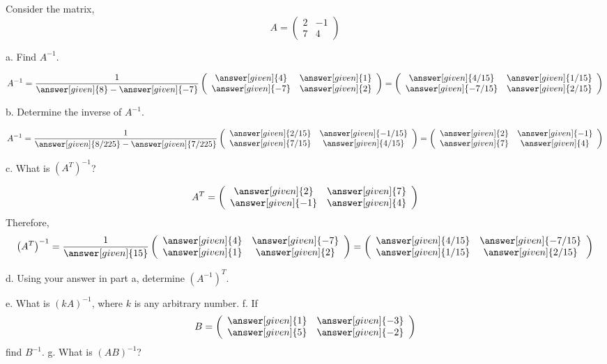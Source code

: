 \documentclass{ximera}
\begin{document}
\begin{example}\label{example1}
Consider the matrix,
\[A= \left(\begin{array}{cc}
  2 &  -1  \\
   7&  4
\end{array}\right)\]

a. Find $A^{-1}$.
\begin{prompt}
\[A^{-1}= \frac{1}{\answer[given]{8}- \answer[given]{-7}}\left(\begin{array}{cc}
  \answer[given]{4} &  \answer[given]{1}  \\
   \answer[given]{-7}&  \answer[given]{2}
\end{array}\right)= \left(\begin{array}{cc}
  \answer[given]{4/15} &  \answer[given]{1/15}  \\
   \answer[given]{-7/15}&  \answer[given]{2/15}
\end{array}\right)
\]
\end{prompt}
b. Determine the inverse of $A^{-1}$.
\begin{prompt}
\[A^{-1}= \frac{1}{\answer[given]{8/225}- \answer[given]{7/225}}\left(\begin{array}{cc}
  \answer[given]{2/15} &  \answer[given]{-1/15}  \\
   \answer[given]{7/15}&  \answer[given]{4/15}
\end{array}\right)= \left(\begin{array}{cc}
  \answer[given]{2} &  \answer[given]{-1}  \\
   \answer[given]{7}&  \answer[given]{4}
\end{array}\right)
\]
\end{prompt}
c. What is $\left(A^{T}\right)^{-1}$?
\begin{prompt}
\[A^{T}= \left(\begin{array}{cc}
  \answer[given]{2} &  \answer[given]{7}  \\
   \answer[given]{-1}&  \answer[given]{4}
\end{array}\right)
\]
Therefore,
\[\left(A^{T}\right)^{-1}= \frac{1}{\answer[given]{15}}\left(\begin{array}{cc}
  \answer[given]{4} &  \answer[given]{-7}  \\
   \answer[given]{1}&  \answer[given]{2}
\end{array}\right) = \left(\begin{array}{cc}
  \answer[given]{4/15} &  \answer[given]{-7/15}  \\
   \answer[given]{1/15}&  \answer[given]{2/15}
\end{array}\right) \]
\end{prompt}
d. Using your answer in part a, determine $\left(A^{-1}\right)^{T}$.

e. What is $(kA)^{-1}$, where $k$ is any arbitrary number.
f. If
\[B= \left(\begin{array}{cc}
  \answer[given]{1} &  \answer[given]{-3}  \\
   \answer[given]{5}&  \answer[given]{-2}
\end{array}\right)
\]
find $B^{-1}$.
g. What is $(AB)^{-1}$?
\end{example}
\end{document}
